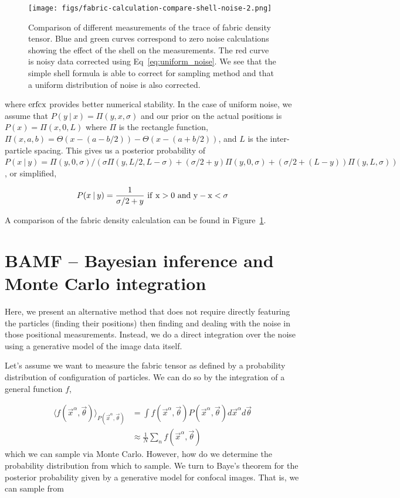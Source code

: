 \documentclass[twocolumn,amsmath,amssymb]{revtex4}
\newcommand\given[1][]{\:#1\vert\:}
\begin{document}
\begin{figure}
    \texttt{[image: figs/fabric-calculation-compare-shell-noise-2.png]}

    \caption{Comparison of different measurements of the trace of fabric
        density tensor. Blue and green curves correspond to zero noise
        calculations showing the effect of the shell on the measurements.  The
        red curve is noisy data corrected using Eq~\ref{eq:uniform_noise}. We
        see that the simple shell formula is able to correct for sampling
    method and that a uniform distribution of noise is also corrected.}

    \label{fig:fabden}
\end{figure}
where $\rm{erfcx}$ provides better numerical stability.  In the case of uniform
noise, we assume that $P(y\given x) = \Pi(y, x, \sigma)$ and our prior on the
actual positions is $P(x) = \Pi(x, 0, L)$ where $\Pi$ is the rectangle
function, $\Pi(x, a, b) = \Theta(x - (a-b/2)) - \Theta(x - (a + b/2))$,
and $L$ is the inter-particle spacing.  This gives us a posterior probability
of $P(x \given y) = \Pi(y, 0, \sigma)/ (\sigma\Pi(y, L/2, L-\sigma) + (\sigma/2+y)\Pi(y, 0, \sigma)
+ (\sigma/2+(L-y))\Pi(y, L, \sigma))$, or simplified,

\begin{equation}
    \label{eq:uniform_noise}
    P(x \given y) = \frac{1}{\sigma/2 + y} \,\,\rm{if}\,\, x > 0 \,\,\rm{and}\,\, y-x < \sigma
\end{equation}

A comparison of the fabric density calculation can be found in Figure~\ref{fig:fabden}.

\section{BAMF -- Bayesian inference and Monte Carlo integration}

Here, we present an alternative method that does not require directly
featuring the particles (finding their positions) then finding and dealing
with the noise in those positional measurements.  Instead, we do a direct
integration over the noise using a generative model of the image data itself.

Let's assume we want to measure the fabric tensor as defined by a probability
distribution of configuration of particles. We can do so by the integration
of a general function $f$,

\begin{align*}
    \langle f(\vec{x}^{\alpha}, \vec{\theta})\rangle_{P(\vec{x}^{\alpha},\vec{\theta})} &= \int f(\vec{x}^{\alpha}, \vec{\theta}) P(\vec{x}^\alpha,\vec{\theta}) d\vec{x}^\alpha d\vec{\theta} \\
                                                                                        &\approx \frac{1}{N}\sum_{n} f(\vec{x}^\alpha, \vec{\theta})
\end{align*}
which we can sample via Monte Carlo.  However, how do we determine the
probability distribution from which to sample.  We turn to Baye's theorem for
the posterior probability given by a generative model for confocal images.
That is, we can sample from
\end{document}
